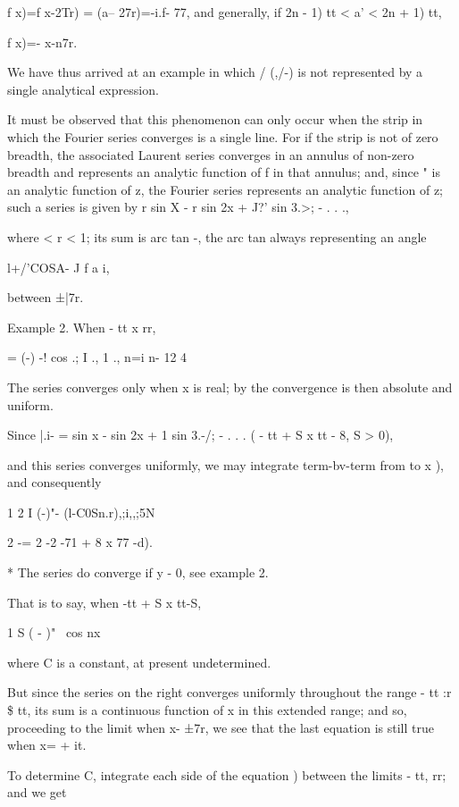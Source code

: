 f x)=f x-2Tr) = (a-- 27r)=-i.f- 77, and generally, if 2n - 1) tt < a'
< 2n + 1) tt,

f x)=- x-n7r.

We have thus arrived at an example in which / (,/-) is not represented
by a single analytical expression.

It must be observed that this phenomenon can only occur when the strip
in which the Fourier series converges is a single line. For if the
strip is not of zero breadth, the associated Laurent series converges
in an annulus of non-zero breadth and represents an analytic function
of f in that annulus; and, since " is an analytic function of z, the
Fourier series represents an analytic function of z; such a series is
given by r sin X - r sin 2x + J?' sin 3.>; - . . .,

where < r < 1; its sum is arc tan -, the arc tan always representing
an angle

l+/'COSA- J f a i,

between ±|7r.

Example 2. When - tt x rr,

= (-) -! cos .; I ., 1 ., n=i n- 12 4

The series converges only when x is real; by the convergence
is then absolute and uniform.

Since |.i- = sin x - sin 2x + 1 sin 3.-/; - . . . ( - tt + S x tt - 8,
S > 0),

and this series converges uniformly, we may integrate term-bv-term
from to x ), and consequently

1 2 I (-)"- (l-C0Sn.r),;i,,;5N

2 -= 2 -2 -71 + 8 x 77 -d).

* The series do converge if y - 0, see example 2.

%
%

That is to say, when -tt + S x tt-S,

  1 S ( - )"~ cos nx

where C is a constant, at present undetermined.

But since the series on the right converges uniformly throughout the
range - tt :r \$ tt, its sum is a continuous function of x in this
extended range; and so, proceeding to the limit when x- ±7r, we see
that the last equation is still true when x= + it.

To determine C, integrate each side of the equation ) between
the limits - tt, rr; and we get

